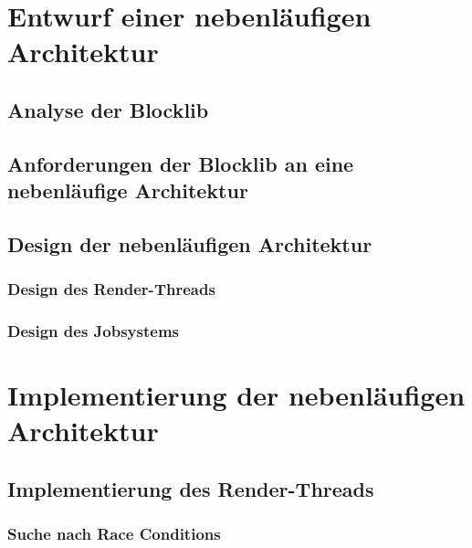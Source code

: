 \documentclass[12pt,a4paper,listof=toc,parskip=half,numbers=noenddot,abstract=true]{scrartcl}
\begin{document}
\section{Entwurf einer nebenläufigen Architektur}\label{kap:entwurf}


\subsection{Analyse der Blocklib}\label{sec:blocklibAnalyse}


\subsection{Anforderungen der Blocklib an eine nebenläufige Architektur}\label{sec:anforderungen}


\subsection{Design der nebenläufigen Architektur}

\subsubsection{Design des Render-Threads}\label{sec:desgignRender-Thread}

\subsubsection{Design des Jobsystems}\label{sec:designJobsystem}


\clearpage
\section{Implementierung der nebenläufigen Architektur}\label{kap:Implementierung}

\subsection{Implementierung des Render-Threads}


\subsubsection{Suche nach Race Conditions}\label{sec:searchRace}

\end{document}
